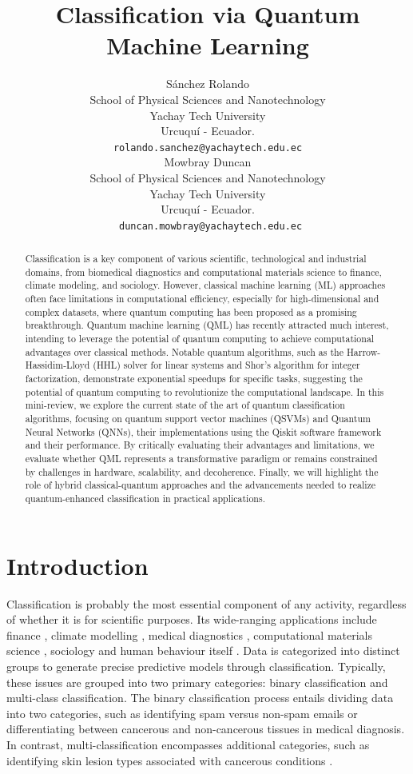 \documentclass{article}
\title{Classification via Quantum Machine Learning} %
\author{
 Sánchez Rolando \\
 School of Physical Sciences and Nanotechnology\\
 Yachay Tech University\\
 Urcuquí - Ecuador. \\
 \texttt{rolando.sanchez@yachaytech.edu.ec} \\
 \And
 Mowbray Duncan \\
 School of Physical Sciences and Nanotechnology\\
 Yachay Tech University\\
 Urcuquí - Ecuador. \\
 \texttt{	duncan.mowbray@yachaytech.edu.ec} \\
}
\begin{document}
\maketitle
\begin{abstract}
Classification is a key component of various scientific, technological and industrial domains, from biomedical diagnostics and computational materials science to finance, climate modeling, and sociology. However, classical machine learning (ML) approaches often face limitations in computational efficiency, especially for high-dimensional and complex datasets, where quantum computing has been proposed as a promising breakthrough. Quantum machine learning (QML) has recently attracted much interest, intending to leverage the potential of quantum computing to achieve computational advantages over classical methods. Notable quantum algorithms, such as the Harrow-Hassidim-Lloyd (HHL) solver for linear systems and Shor's algorithm for integer factorization, demonstrate exponential speedups for specific tasks, suggesting the potential of quantum computing to revolutionize the computational landscape. In this mini-review, we explore the current state of the art of quantum classification algorithms, focusing on quantum support vector machines (QSVMs) and Quantum Neural Networks (QNNs), their implementations using the Qiskit software framework and their performance. By critically evaluating their advantages and limitations, we evaluate whether QML represents a transformative paradigm or remains constrained by challenges in hardware, scalability, and decoherence. Finally, we will highlight the role of hybrid classical-quantum approaches and the advancements needed to realize quantum-enhanced classification in practical applications.
\end{abstract}


\section*{Introduction}

Classification is probably the most essential component of any activity, regardless of whether it is for scientific purposes. 
Its wide-ranging applications include finance \cite{SMAILOVIC2014181}, climate modelling \cite{gmd-16-6433-2023}, medical diagnostics \cite{doi:10.1148/rg.2017160130}, computational materials science \cite{LIU2017159}, sociology \cite{Franco2021} and human behaviour itself \cite{Richards2019}. 
Data is categorized into distinct groups to generate precise predictive models through classification. 
Typically, these issues are grouped into two primary categories: binary classification and multi-class classification. 
The binary classification process entails dividing data into two categories, such as identifying spam versus non-spam emails or differentiating between 
cancerous and non-cancerous tissues in medical diagnosis.
In contrast, multi-classification encompasses additional categories, such as identifying skin lesion types associated with cancerous conditions \cite{10613907}.
\end{document}
